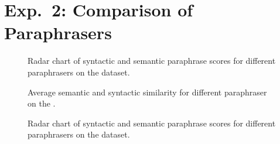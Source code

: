 \section{Exp.\ 2: Comparison of Paraphrasers}
\label{sec:app_paraphrases}

\begin{figure}[H]
    \centering
    
    \caption[Paraphrase evaluation radar chart on the \dataBlog{} dataset.]{Radar chart of syntactic and semantic paraphrase scores for different paraphrasers on the \dataBlog{} dataset.}
    \label{fig:radar_blog}
\end{figure}


\begin{figure}[H]
    \centering
    
    \caption[Comparison of paraphrasers on the \dataGutenberg{} dataset.]{Average semantic and syntactic similarity for different paraphraser on the \dataGutenberg{}.}
    \label{fig:sem_syn_gutenberg}
\end{figure}

\begin{figure}[H]
    \centering
    
    \caption[Paraphrase evaluation radar chart on the \dataGutenberg{} dataset.]{Radar chart of syntactic and semantic paraphrase scores for different paraphrasers on the \dataGutenberg{} dataset.}
    \label{fig:radar_gutenberg}
\end{figure}
